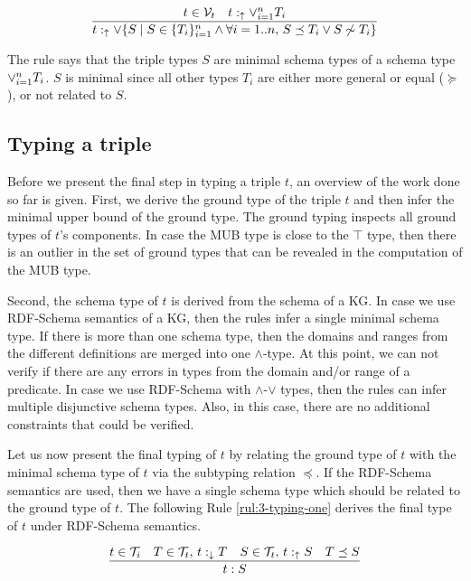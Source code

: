 \documentclass[runningheads]{llncs}
\newcommand{\darr}{\downarrow}
\newcommand{\uarr}{\uparrow}
\newcommand{\V}{{\cal V}}
\newcommand{\T}{{\cal T}}
\begin{document}
\begin{equation}
\label{rul:3-min}
\dfrac{t\in\V_t\quad\/t:_\uarr\lor_{i=1}^n\/T_i}
      {t:_{\uarr}\lor\{S \mid S\in\/\{T_i\}_{i=1}^n\land\forall\/i=1..n,\, S\preceq\/T_i\lor\/S\not\sim\/T_i\}}
\end{equation}

The rule says that the triple types $S$ are minimal schema types of a
schema type $\lor_{i=1}^n\/T_i$. $S$ is minimal since all other
types $T_i$ are either more general or equal ($\succeq$), or not
related to $S$. 





\subsection{Typing a triple}

Before we present the final step in typing a triple $t$, an overview
of the work done so far is given. First, we derive the ground type of
the triple $t$ and then infer the minimal upper bound of the ground
type. The ground typing inspects all ground types of $t$'s
components. In case the MUB type is close to the $\top$ type, then
there is an outlier in the set of ground types that can be revealed in
the computation of the MUB type.

Second, the schema type of $t$ is derived from the schema of a KG. In
case we use RDF-Schema semantics of a KG, then the rules infer a
single minimal schema type. If there is more than one schema type,
then the domains and ranges from the different definitions are merged
into one $\land$-type. At this point, we can not verify if there are
any errors in types from the domain and/or range of a predicate. In
case we use RDF-Schema with $\land$-$\lor$ types, then the rules can
infer multiple disjunctive schema types. Also, in this case, there are
no additional constraints that could be verified.

Let us now present the final typing of $t$ by relating the ground type
of $t$ with the minimal schema type of $t$ via the subtyping relation
$\preceq$. If the RDF-Schema semantics are used, then we have a single
schema type which should be related to the ground type of $t$. The
following Rule \ref{rul:3-typing-one} derives the final type of $t$
under RDF-Schema semantics.

\begin{equation}
\label{rul:3-typing-one}
\dfrac{t\in\T_i\quad T\in\T_t,\, t:_{\darr}T\quad S\in\T_t,\, t:_\uarr\/S\quad T\preceq\/S}
      {t:S}
\end{equation}
\end{document}

